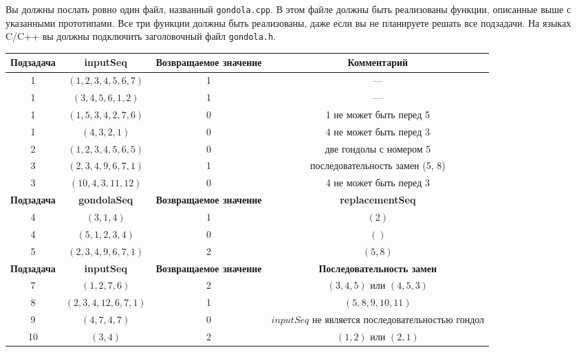 Вы должны послать ровно один файл, названный \texttt{gondola.cpp}. В этом файле должны быть реализованы функции, описанные выше с указанными прототипами. Все три функции должны быть реализованы, даже если вы не планируете решать все подзадачи. На языках C/C++ вы должны подключить заголовочный файл \texttt{gondola.h}.

\begin{center}
\renewcommand{\arraystretch}{1.5}
\begin{tabular}{|c|c|c|c|}
\hline
\textbf{Подзадача} & \textbf{inputSeq} & \parbox{2.8cm}{\centering \vspace{2mm}\textbf{Возвращаемое значение}\\\vspace{2mm}} & \textbf{Комментарий} \\
 & $(1, 2, 3, 4, 5, 6, 7)$ & 1 & --- \\
 & $(3, 4, 5, 6, 1, 2)$ & 1 & --- \\
 & $(1, 5, 3, 4, 2, 7, 6)$ & 0 & 1 не может быть перед 5 \\
 & $(4, 3, 2, 1)$ & 0 & 4 не может быть перед 3 \\
 & $(1, 2, 3, 4, 5, 6, 5)$ & 0 & две гондолы с номером 5 \\
 & $(2, 3, 4, 9, 6, 7, 1)$ & 1 & последовательность замен (5, 8) \\
 & $(10, 4, 3, 11, 12)$ & 0 & 4 не может быть перед 3 \\
\hline
\textbf{Подзадача} & \textbf{gondolaSeq} & \parbox{2.8cm}{\centering \vspace{2mm}\textbf{Возвращаемое значение}\\\vspace{2mm}} & \textbf{replacementSeq} \\
 & $(3, 1, 4)$ & 1 & $(2)$ \\
 & $(5, 1, 2, 3, 4)$ & 0 & $()$ \\
 & $(2, 3, 4, 9, 6, 7, 1)$ & 2 & $(5, 8)$ \\
\hline
\textbf{Подзадача} & \textbf{inputSeq} & \parbox{2.8cm}{\centering \vspace{2mm}\textbf{Возвращаемое значение}\\\vspace{2mm}} & \textbf{Последовательность замен} \\
 & $(1, 2, 7, 6)$ & 2 & $(3, 4, 5)$ или $(4, 5, 3)$ \\
 & $(2, 3, 4, 12, 6, 7, 1)$ & 1 & $(5, 8, 9, 10, 11)$ \\
 & $(4, 7, 4, 7)$ & 0 & $inputSeq$ не является последовательностью гондол \\
 & $(3, 4)$ & 2 & $(1, 2)$ или $(2, 1)$ \\
\hline
\end{tabular}
\end{center}
